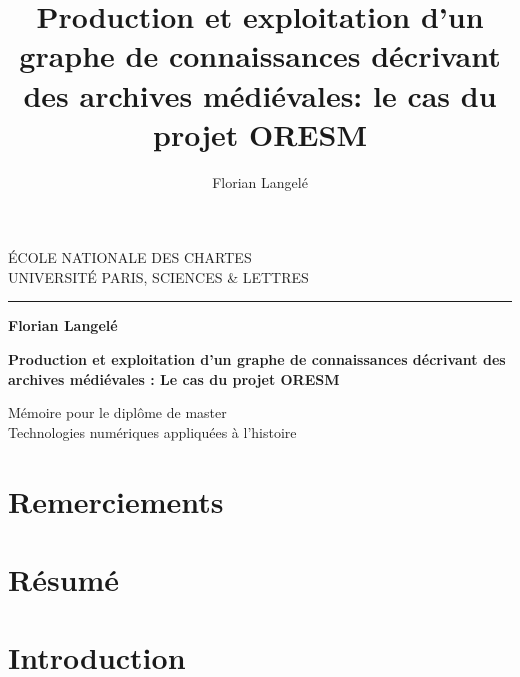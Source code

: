 \documentclass[a4paper, 12pt, twoside]{book}
\title{Production et exploitation d’un graphe de connaissances décrivant des archives médiévales: le cas du projet ORESM}
\author{Florian Langelé}
\begin{document}
    \begin{titlepage}
		\begin{center}
			
			\bigskip
			
			\begin{large}				
				ÉCOLE NATIONALE DES CHARTES\\
				UNIVERSITÉ PARIS, SCIENCES \& LETTRES
			\end{large}
			\begin{center}\rule{2cm}{0.02cm}\end{center}
			
			\bigskip
			\bigskip
			\bigskip
			
			\begin{Large}
				\textbf{Florian Langelé}\\
			\end{Large}
			\bigskip
			\bigskip
			\bigskip
                \bigskip
               \bigskip
			
			\begin{Huge}
				\textbf{Production et exploitation d’un graphe de connaissances décrivant des archives médiévales : Le cas du projet ORESM}\\
			\end{Huge}
			\bigskip
			
			\bigskip
			\bigskip
			\bigskip

   
			\vfill
			
			\begin{large}
				Mémoire 
				pour le diplôme de master \\
				\og{} Technologies numériques appliquées à l'histoire \fg{} \\
			\end{large}
		\end{center}
	\end{titlepage}

    \thispagestyle{empty}
\cleardoublepage
    
\frontmatter
\chapter{Remerciements}

\printbibliography
{}
\chapter{Résumé}

\chapter{Introduction}

\mainmatter
\end{document}
